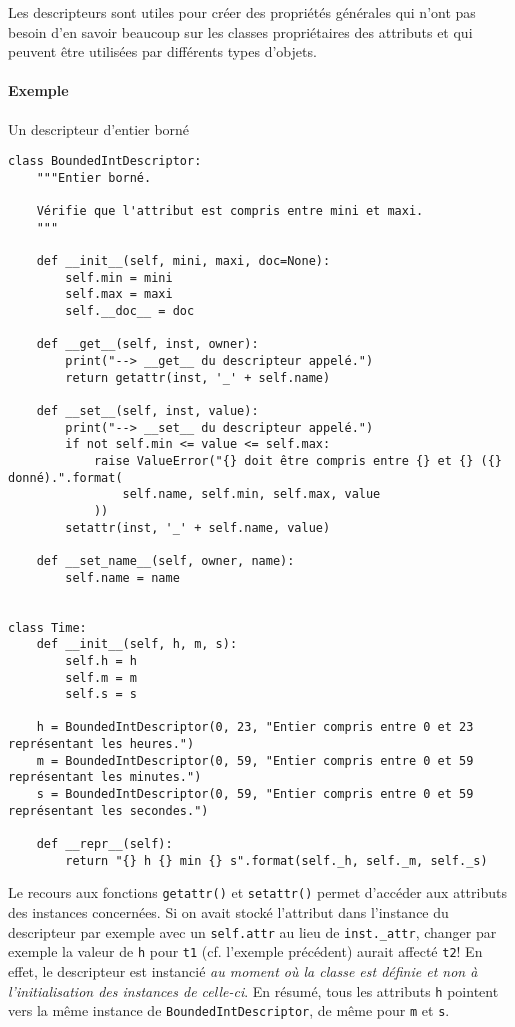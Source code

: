 Les descripteurs sont utiles pour créer des \og propriétés générales \fg{} qui n'ont pas besoin d'en savoir
beaucoup sur les classes propriétaires des attributs et qui peuvent être utilisées par différents types d'objets.

\paragraph{Exemple} Un descripteur d'entier borné
\begin{verbatim}
class BoundedIntDescriptor:
    """Entier borné.
    
    Vérifie que l'attribut est compris entre mini et maxi.
    """
    
    def __init__(self, mini, maxi, doc=None):
        self.min = mini
        self.max = maxi
        self.__doc__ = doc

    def __get__(self, inst, owner):
        print("--> __get__ du descripteur appelé.")
        return getattr(inst, '_' + self.name)

    def __set__(self, inst, value):
        print("--> __set__ du descripteur appelé.")
        if not self.min <= value <= self.max:
            raise ValueError("{} doit être compris entre {} et {} ({} donné).".format(
                self.name, self.min, self.max, value
            ))
        setattr(inst, '_' + self.name, value)
    
    def __set_name__(self, owner, name):
        self.name = name


class Time:
    def __init__(self, h, m, s):
        self.h = h
        self.m = m
        self.s = s

    h = BoundedIntDescriptor(0, 23, "Entier compris entre 0 et 23 représentant les heures.")
    m = BoundedIntDescriptor(0, 59, "Entier compris entre 0 et 59 représentant les minutes.")
    s = BoundedIntDescriptor(0, 59, "Entier compris entre 0 et 59 représentant les secondes.")

    def __repr__(self):
        return "{} h {} min {} s".format(self._h, self._m, self._s)
\end{verbatim}

Le recours aux fonctions \texttt{getattr()} et \texttt{setattr()} permet d'accéder aux attributs
des instances concernées. Si on avait stocké l'attribut dans l'instance du descripteur par exemple avec un \texttt{self.attr} au lieu de \texttt{inst._attr}, changer par exemple la valeur de \texttt{h} pour \texttt{t1} (cf. l'exemple précédent) aurait affecté \texttt{t2}! En effet, le descripteur est instancié \emph{au moment où la classe est définie et non à l'initialisation des instances de celle-ci}. En résumé, tous les attributs \texttt{h} pointent vers la même instance de \texttt{BoundedIntDescriptor}, de même pour \texttt{m} et \texttt{s}.\medskip

